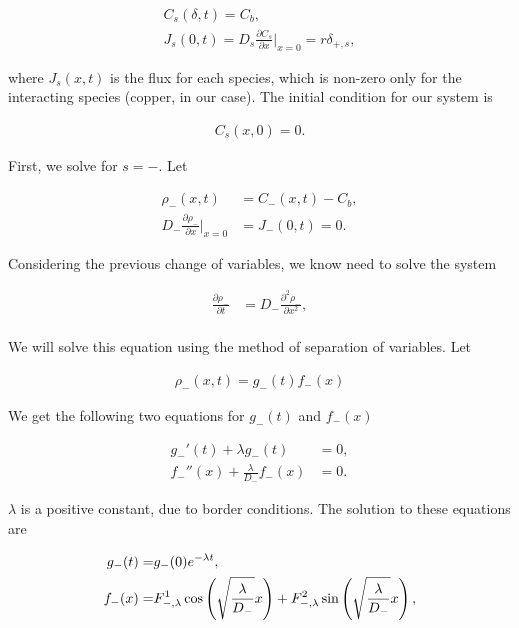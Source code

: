 \begin{align}
C_s(\delta, t) = C_b,\\
J_s(0,t) = D_s\frac{\partial C_s}{\partial x}\big|_{x=0} = r\delta_{+,s},
\label{eq:diffusion-bc}
\end{align}

where $J_s(x,t)$ is the flux for each species, which is non-zero only for the interacting species (copper, in our case). The initial condition for our system is

\begin{align}
	C_s(x, 0) = 0.
\label{eq:diffusion-bc}
\end{align}

First, we solve for $s=-$. Let 

\begin{align}
	\rho_-(x,t) &= C_-(x,t) - C_b,\\
	D_-\frac{\partial \rho_-}{\partial x}\big|_{x=0} &= J_-(0, t) = 0.
\end{align}

Considering the previous change of variables, we know need to solve the system

\begin{align}
\frac{\partial \rho_-}{\partial t} &= D_- \frac{\partial^2 \rho_-}{\partial x^2},\\
\label{eq:diffusion-1d}
\end{align}


We will solve this equation using the method of separation of variables. Let

\begin{align}
	\rho_-(x,t) = g_-(t)f_-(x)
\end{align}

We get the following two equations for $g_-(t)$ and $f_-(x)$


\begin{align}
	g_-'(t) + \lambda g_-(t) &= 0,\\
	f_-''(x) + \frac{\lambda}{D_-} f_-(x) &= 0.
\end{align}

$\lambda$ is a positive constant, due to border conditions. The solution to these equations are

\begin{align}
	g_-(t) =& g_{-}(0)e^{-\lambda t},\\
	f_-(x) =& F^1_{-,\lambda}\cos\left({{\sqrt{\frac{\lambda}{D_-}} x}}\right) + F^2_{-,\lambda}\sin\left({\sqrt{\frac{\lambda}{D_-}} x}\right),
\end{align}

